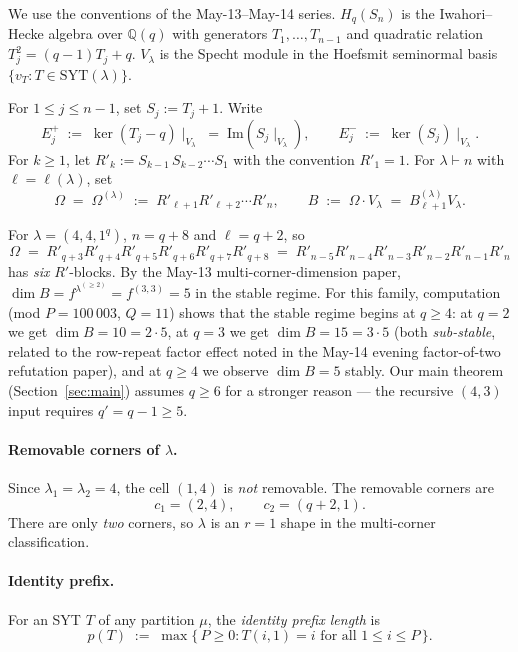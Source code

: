 \documentclass[11pt]{article}
\theoremstyle{definition}
\newcommand{\Hq}{H_q}
\newcommand{\Sn}{S_n}
\newcommand{\Vlam}{V_\lambda}
\newcommand{\Bdec}{B_{\ell+1}^{(\lambda)}}
\newcommand{\Om}{\Omega}
\newcommand{\SYT}{\mathrm{SYT}}
\newcommand{\Rp}{{R'}}
\begin{document}
We use the conventions of the May-13--May-14 series.  $\Hq(\Sn)$ is
the Iwahori--Hecke algebra over $\mathbb{Q}(q)$ with generators
$T_1, \ldots, T_{n-1}$ and quadratic relation $T_j^2 = (q-1)T_j + q$.
$\Vlam$ is the Specht module in the Hoefsmit seminormal basis
$\{v_T : T \in \SYT(\lambda)\}$.

For $1 \le j \le n-1$, set $S_j := T_j + 1$.  Write
\[
   E_j^+ \;:=\; \ker(T_j - q)\!\mid_{\Vlam}
   \;=\; \mathrm{Im}(S_j\!\mid_{\Vlam}),
   \qquad
   E_j^- \;:=\; \ker(S_j)\!\mid_{\Vlam}.
\]
For $k \ge 1$, let $\Rp_k := S_{k-1}\,S_{k-2}\cdots S_1$ with the
convention $\Rp_1 = 1$.  For $\lambda \vdash n$ with
$\ell = \ell(\lambda)$, set
\[
   \Om \;=\; \Om^{(\lambda)} \;:=\; \Rp_{\ell+1}\Rp_{\ell+2}\cdots \Rp_n,
   \qquad
   B \;:=\; \Om \cdot \Vlam \;=\; \Bdec \Vlam.
\]

For $\lambda = (4, 4, 1^q)$, $n = q + 8$ and $\ell = q + 2$, so
\[
   \Om \;=\; \Rp_{q+3}\Rp_{q+4}\Rp_{q+5}\Rp_{q+6}\Rp_{q+7}\Rp_{q+8}
   \;=\; \Rp_{n-5}\Rp_{n-4}\Rp_{n-3}\Rp_{n-2}\Rp_{n-1}\Rp_n
\]
has \emph{six} $\Rp$-blocks.  By the May-13 multi-corner-dimension
paper, $\dim B = f^{\lambda^{(\ge 2)}} = f^{(3, 3)} = 5$ in the stable
regime.  For this family, computation (mod $P = 100\,003$, $Q = 11$)
shows that the stable regime begins at $q \ge 4$: at $q = 2$ we get
$\dim B = 10 = 2{\cdot}5$, at $q = 3$ we get $\dim B = 15 = 3{\cdot}5$
(both \emph{sub-stable}, related to the row-repeat factor effect noted
in the May-14 evening factor-of-two refutation paper), and at $q \ge
4$ we observe $\dim B = 5$ stably.  Our main theorem (Section~\ref{sec:main})
assumes $q \ge 6$ for a stronger reason --- the recursive $(4, 3)$
input requires $q' = q - 1 \ge 5$.

\paragraph{Removable corners of $\lambda$.}
Since $\lambda_1 = \lambda_2 = 4$, the cell $(1, 4)$ is \emph{not}
removable.  The removable corners are
\[
   c_1 = (2, 4), \qquad c_2 = (q+2, 1).
\]
There are only \emph{two} corners, so $\lambda$ is an $r = 1$ shape in
the multi-corner classification.

\paragraph{Identity prefix.}  For an SYT $T$ of any partition $\mu$,
the \emph{identity prefix length} is
\[
   p(T) \;:=\; \max\{\,P \ge 0 : T(i, 1) = i \text{ for all }
   1 \le i \le P\,\}.
\]
\end{document}
